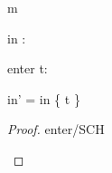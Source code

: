 \begin{machine}{m}
\begin{variable}
	in : \set[\TRAIN]
\end{variable}


\begin{use:set}{\TRAIN} \end{use:set}

\begin{indices}{enter}
	t: \TRAIN
\end{indices}

\begin{banana}
{	in' = in \bunion \{ t \} }
\end{banana}

\begin{proof}{enter/SCH}
	\begin{calculation}
		\true
	\hint{=}{ \ref{a1} }
		\true
	\end{calculation}
\end{proof}
\end{machine}